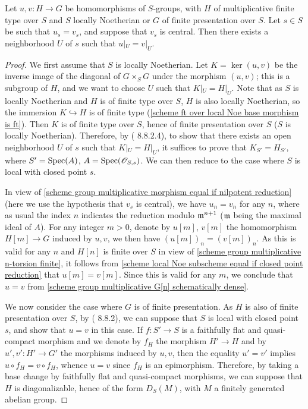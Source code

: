 \begin{theorem}\label{scheme group multiplicative morphism lifting from fiber}
Let $u,v:H\to G$ be homomorphisms of $S$-groups, with $H$ of multiplicative finite type over $S$ and $S$ locally Noetherian or $G$ of finite presentation over $S$. Let $s\in S$ be such that $u_s=v_s$, and suppose that $v_s$ is central. Then there exists a neighborhood $U$ of $s$ such that $u|_U=v|_U$.
\end{theorem}
\begin{proof}
We first assume that $S$ is locally Noetherian. Let $K=\ker(u,v)$ be the inverse image of the diagonal of $G\times_SG$ under the morphism $(u,v)$; this is a subgroup of $H$, and we want to choose $U$ such that $K|_U=H|_U$. Note that as $S$ is locally Noetherian and $H$ is of finite type over $S$, $H$ is also locally Noetherian, so the immersion $K\hookrightarrow H$ is of finite type (\cref{scheme ft over local Noe base morphism is ft}). Then $K$ is of finite type over $S$, hence of finite presentation over $S$ ($S$ is locally Noetherian). Therefore, by (\cite{EGA4-3} 8.8.2.4), to show that there exists an open neighborhood $U$ of $s$ such that $K|_U=H|_U$, it suffices to prove that $K_{S'}=H_{S'}$, where $S'=\mathrm{Spec}(A)$, $A=\mathrm{Spec}(\mathscr{O}_{S,s})$. We can then reduce to the case where $S$ is local with closed point $s$.\par
In view of \cref{scheme group multiplicative morphism equal if nilpotent reduction} (here we use the hypothesis that $v_s$ is central), we have $u_n=v_n$ for any $n$, where as usual the index $n$ indicates the reduction modulo $\mathfrak{m}^{n+1}$ ($\mathfrak{m}$ being the maximal ideal of $A$). For any integer $m>0$, denote by $u[m]$, $v[m]$ the homomorphism $H[m]\to G$ induced by $u,v$, we then have $(u[m])_n=(v[m])_n$. As this is valid for any $n$ and $H[n]$ is finite over $S$ in view of \cref{scheme group multiplicative n-torsion finite}, it follows from \cref{scheme local Noe subscheme equal if closed point reduction} that $u[m]=v[m]$. Since this is valid for any $m$, we conclude that $u=v$ from \cref{scheme group multiplicative G[n] schematically dense}.\par
We now consider the case where $G$ is of finite presentation. As $H$ is also of finite presentation over $S$, by (\cite{EGA4-3} 8.8.2), we can suppose that $S$ is local with closed point $s$, and show that $u=v$ in this case. If $f:S'\to S$ is a faithfully flat and quasi-compact morphism and we denote by $f_H$ the morphism $H'\to H$ and by $u',v':H'\to G'$ the morphisms induced by $u,v$, then the equality $u'=v'$ implies $u\circ f_H=v\circ f_H$, whence $u=v$ since $f_H$ is an epimorphism. Therefore, by taking a base change by faithfully flat and quasi-compact morphisms, we can suppose that $H$ is diagonalizable, hence of the form $D_S(M)$, with $M$ a finitely generated abelian group.\par

\end{proof}
